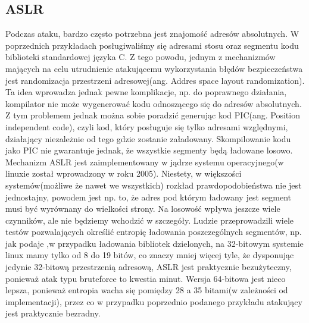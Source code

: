 \documentclass[polish]{kbk}
\begin{document}
\subsection{ASLR}
Podczas ataku, bardzo często potrzebna jest znajomość adresów absolutnych. W 
poprzednich przykładach posługiwaliśmy się adresami stosu oraz segmentu kodu 
biblioteki standardowej języka C. Z tego powodu, jednym z mechanizmów mających na 
celu utrudnienie atakującemu wykorzystania błędów bezpieczeństwa jest randomizacja 
przestrzeni adresowej(ang. Addres space layout randomization). Ta idea wprowadza 
jednak pewne komplikacje, np. do poprawnego działania, kompilator nie może 
wygenerować kodu odnoszącego się do adresów absolutnych. Z tym problemem jednak 
można sobie poradzić generując kod PIC(ang. Position independent code), czyli kod, 
który posługuje się tylko adresami względnymi, działający niezależnie od tego 
gdzie zostanie załadowany. Skompilowanie kodu jako PIC nie gwarantuje jednak, 
że wszystkie segmenty będą ładowane losowo. Mechanizm ASLR jest zaimplementowany 
w jądrze systemu operacyjnego(w linuxie został wprowadzony w roku 2005). 
Niestety, w większości systemów(możliwe że nawet we wszystkich) rozkład 
prawdopodobieństwa nie jest jednostajny, powodem jest np. to, że adres pod 
którym ładowany jest segment musi być wyrównany do wielkości strony. Na 
losowość wpływa jeszcze wiele czynników, ale nie będziemy wchodzić w szczegóły. 
Ludzie przeprowadzili wiele testów pozwalających określić entropię ładowania 
poszczególnych segmentów, np. jak podaje \cite{aslr},w przypadku ładowania 
bibliotek dzielonych, na 32-bitowym systemie linux mamy tylko od 8 do 19 bitów, 
co znaczy mniej więcej tyle, że dysponując jedynie 32-bitową przestrzenią adresową, 
ASLR jest praktycznie bezużyteczny, ponieważ atak typu bruteforce to kwestia minut. 
Wersja 64-bitowa jest nieco lepsza, ponieważ entropia wacha się pomiędzy 28 a 35 
bitami(w zależności od implementacji), przez co w przypadku poprzednio podanego 
przykładu atakujący jest praktycznie bezradny.
\end{document}
